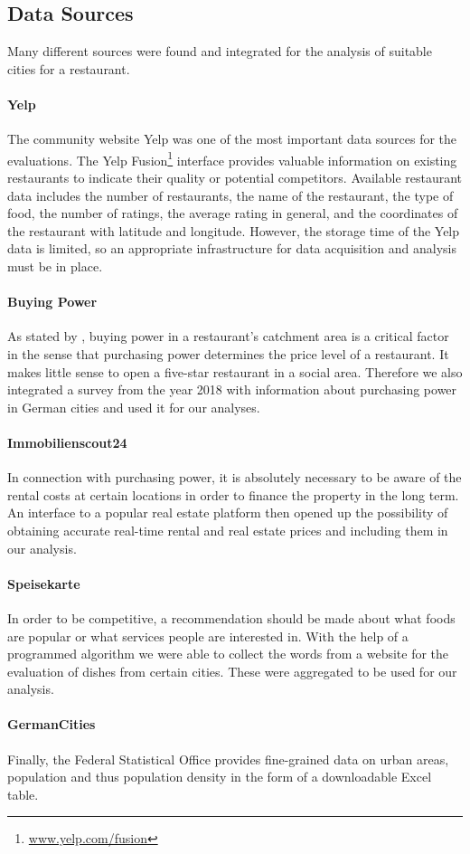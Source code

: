 \subsection{Data Sources}
\label{subsec:sources}
Many different sources were found and integrated for the analysis of suitable cities for a restaurant. 
\newline
\paragraph{Yelp}
The community website Yelp was one of the most important data sources for the evaluations. The Yelp Fusion\footnote{\href{https://www.yelp.com/fusion}{www.yelp.com/fusion}} interface provides valuable information on existing restaurants to indicate their quality or potential competitors. Available restaurant data includes the number of restaurants, the name of the restaurant, the type of food, the number of ratings, the average rating in general, and the coordinates of the restaurant with latitude and longitude. However, the storage time of the Yelp data is limited, so an appropriate infrastructure for data acquisition and analysis must be in place.
\newline
\paragraph {Buying Power}
As stated by \cite{locana}, buying power in a restaurant's catchment area is a critical factor in the sense that purchasing power determines the price level of a restaurant. It makes little sense to open a five-star restaurant in a social area. Therefore we also integrated a survey \cite{buyingpower} from the year 2018 with information about purchasing power in German cities and used it for our analyses.
\newline
\paragraph{Immobilienscout24}
In connection with purchasing power, it is absolutely necessary to be aware of the rental costs at certain locations in order to finance the property in the long term\cite{locana}. An interface to a popular real estate platform \cite{ImmoScout} then opened up the possibility of obtaining accurate real-time rental and real estate prices and including them in our analysis.
\newline
\paragraph{Speisekarte}
In order to be competitive, a recommendation should be made about what foods are popular or what services people are interested in. With the help of a programmed algorithm we were able to collect the words from a website \cite{speisekarte} for the evaluation of dishes from certain cities. These were aggregated to be used for our analysis.
\newline
\paragraph{GermanCities}
Finally, the Federal Statistical Office provides fine-grained data on urban areas, population and thus population density in the form of a downloadable Excel table.\cite{destatis}
